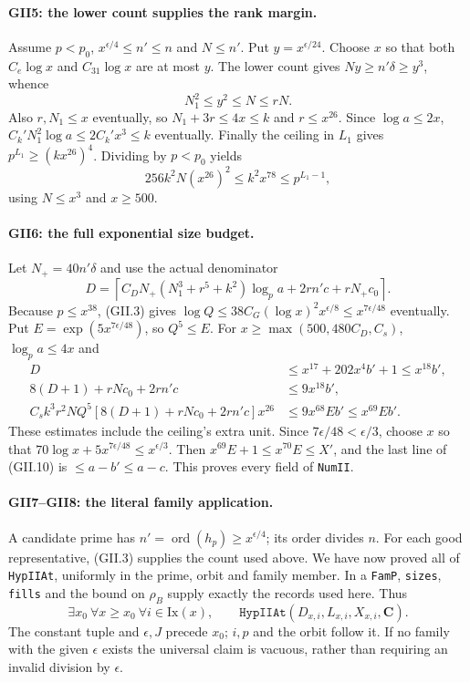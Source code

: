 \documentclass[11pt,a4paper]{article}
\numberwithin{equation}{section}
\theoremstyle{remark}\newtheorem{remark}[theorem]{Remark}
\begin{document}
\paragraph{GII5: the lower count supplies the rank margin.}
Assume $p<p_0$, $x^{\epsilon/4}\le n'\le n$ and $N\le n'$.
Put $y=x^{\epsilon/24}$. Choose $x$ so that both $C_e\log x$ and
$C_{31}\log x$ are at most $y$. The lower count gives
$Ny\ge n'\delta\ge y^3$, whence
\[
 N_1^2\le y^2\le N\le rN.\tag{GII.7}
\]
Also $r,N_1\le x$ eventually, so $N_1+3r\le4x\le k$ and
$r\le x^{26}$. Since $\log a\le2x$,
$C_k'N_1^2\log a\le2C_k'x^3\le k$ eventually. Finally the ceiling in
$L_1$ gives $p^{L_1}\ge(kx^{26})^4$. Dividing by $p<p_0$ yields
\[
 256k^2N(x^{26})^2\le k^2x^{78}\le p^{L_1-1},\tag{GII.8}
\]
using $N\le x^3$ and $x\ge500$.

\paragraph{GII6: the full exponential size budget.}
Let $N_+=40n'\delta$ and use the actual denominator
\[
 D=\left\lceil C_DN_+(N_1^3+r^5+k^2)\log_pa
                 +2rn'c+rN_+c_0\right\rceil.\tag{GII.9}
\]
Because $p\le x^{38}$, (GII.3) gives
$\log Q\le38C_G(\log x)^2x^{\epsilon/8}\le x^{7\epsilon/48}$
eventually. Put $E=\exp(5x^{7\epsilon/48})$, so $Q^5\le E$.
For $x\ge\max(500,480C_D,C_s)$, $\log_pa\le4x$ and
\[
\begin{aligned}
 D&\le x^{17}+202x^4b'+1\le x^{18}b',\\
 8(D+1)+rNc_0+2rn'c&\le9x^{18}b',\\
 C_sk^3r^2NQ^5[8(D+1)+rNc_0+2rn'c]x^{26}
   &\le9x^{68}Eb'\le x^{69}Eb'.
\end{aligned}\tag{GII.10}
\]
These estimates include the ceiling's extra unit. Since
$7\epsilon/48<\epsilon/3$, choose $x$ so that
$70\log x+5x^{7\epsilon/48}\le x^{\epsilon/3}$. Then
$x^{69}E+1\le x^{70}E\le X'$, and the last line of (GII.10) is
$\le a-b'\le a-c$. This proves every field of \texttt{NumII}.

\paragraph{GII7--GII8: the literal family application.}
A candidate prime has $n'=\operatorname{ord}(h_p)\ge x^{\epsilon/4}$;
its order divides $n$. For each good representative, (GII.3) supplies
the count used above. We have now proved all of \texttt{HypIIAt},
uniformly in the prime, orbit and family member. In a \texttt{FamP},
\texttt{sizes}, \texttt{fills} and the bound on $\rho_B$ supply exactly
the records used here. Thus
\[
 \exists x_0\ \forall x\ge x_0\ \forall i\in\mathrm{Ix}(x),
 \qquad\texttt{HypIIAt}(D_{x,i},L_{x,i},X_{x,i},\mathbf C).
 \tag{GII.11}
\]
The constant tuple and $\epsilon,J$ precede $x_0$; $i,p$ and the orbit
follow it. If no family with the given $\epsilon$ exists the universal
claim is vacuous, rather than requiring an invalid division by $\epsilon$.
\end{document}
